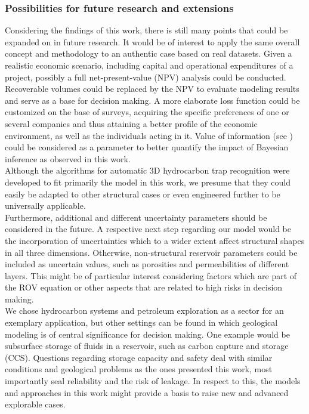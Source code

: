 	\subsubsection{Possibilities for future research and extensions}	
	Considering the findings of this work, there is still many points that could be expanded on in future research. It would be of interest to apply the same overall concept and methodology to an authentic case based on real datasets. Given a realistic economic scenario, including capital and operational expenditures of a project, possibly a full net-present-value (NPV) analysis could be conducted. Recoverable volumes could be replaced by the NPV to evaluate modeling results and serve as a base for decision making. A more elaborate loss function could be customized on the base of surveys, acquiring the specific preferences of one or several companies and thus attaining a better profile of the economic environment, as well as the individuals acting in it. Value of information (see \citet{eidsvik2015voi}) could be considered as a parameter to better quantify the impact of Bayesian inference as observed in this work.\\
	Although the algorithms for automatic 3D hydrocarbon trap recognition were developed to fit primarily the model in this work, we presume that they could easily be adapted to other structural cases or even engineered further to be universally applicable.\\
	Furthermore, additional and different uncertainty parameters should be considered in the future. A respective next step regarding our model would be the incorporation of uncertainties which to a wider extent affect structural shapes in all three dimensions. Otherwise, non-structural reservoir parameters could be included as uncertain values, such as porosities and permeabilities of different layers. This might be of particular interest considering factors which are part of the ROV equation or other aspects that are related to high risks in decision making.\\
	We chose hydrocarbon systems and petroleum exploration as a sector for an exemplary application, but other settings can be found in which geological modeling is of central significance for decision making. One example would be subsurface storage of fluids in a reservoir, such as carbon capture and storage (CCS). Questions regarding storage capacity and safety deal with similar conditions and geological problems as the ones presented this work, most importantly seal reliability and the risk of leakage. In respect to this, the models and approaches in this work might provide a basis to raise new and advanced explorable cases.